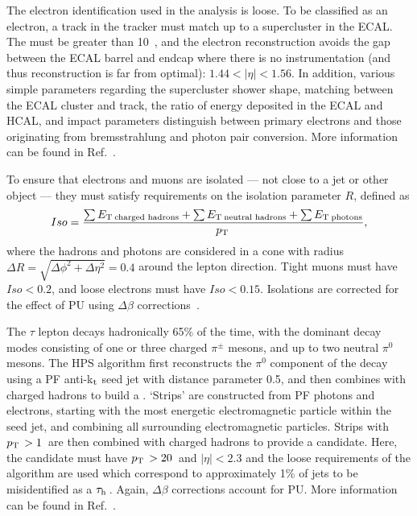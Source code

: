 The electron identification used in the analysis is loose. To be classified as an electron, a track in the tracker must match up to a supercluster in the \ac{ECAL}. 
The \pt must be greater than 10~\GeV, 
and the electron reconstruction avoids the gap between the \ac{ECAL} barrel and endcap where there is no instrumentation (and thus reconstruction is far from optimal): 
$1.44< |\eta| < 1.56 $. 
In addition, various simple parameters regarding the supercluster shower shape, matching between the \ac{ECAL} cluster and track, 
the ratio of energy deposited in the \ac{ECAL} and \ac{HCAL}, and impact parameters distinguish between primary electrons and those originating from bremsstrahlung and photon pair conversion. More information can be found in Ref.~\cite{CMS:elecReco}.

To ensure that electrons and muons are isolated --- not close to a jet or other object --- they must satisfy requirements on the isolation parameter $R$, defined as
\begin{equation}
Iso = \frac{\sum{\ensuremath{E_{\text{T}}}\,_{\text{charged hadrons}}}+ \sum{\ensuremath{E_{\text{T}}}\,_{\text{neutral hadrons}}}+ \sum{\ensuremath{E_{\text{T}}}\,_{\text{photons}}} }{p_{\text{T}}\,},
\end{equation} 
where the hadrons and photons are considered in a cone with radius $\Delta R=\sqrt{\Delta \phi ^{2} + \Delta \eta ^{2}}=0.4$ around the lepton direction.
Tight muons must have $Iso<0.2$, and loose electrons must have $Iso<0.15$.
Isolations are corrected for the effect of \ac{PU} using $\Delta\beta$ corrections~\cite{deltabeta_htautau7tev}.


The $\tau$ lepton decays hadronically 65\% of the time, with the dominant decay modes consisting of one or three charged $\pi^{\pm}$ mesons, and up to two neutral $\pi^{0}$ mesons.
The \ac{HPS} algorithm first reconstructs the $\pi^{0}$ component of the \tauh decay using a \ac{PF} anti-k$_{\rm t}$ seed jet with distance parameter 0.5, and then combines with charged hadrons to build a \tauh. 
`Strips' are constructed from \ac{PF} photons and electrons, starting with the most energetic electromagnetic particle within the seed jet, and combining all surrounding electromagnetic particles.
Strips with $p_{\text{T}}\, > 1$~\GeV are then combined with charged hadrons to provide a \tauh candidate. 
Here, the candidate must have $p_{\text{T}}\, > 20$~\GeV and $|\eta| < 2.3$ and the loose requirements of the algorithm are used which correspond to approximately 1\% of jets to be misidentified as a $\tau_\mathrm{h}\,$.
Again, $\Delta\beta$ corrections account for \ac{PU}. 
More information can be found in Ref.~\cite{bib:HPStaus}. 



